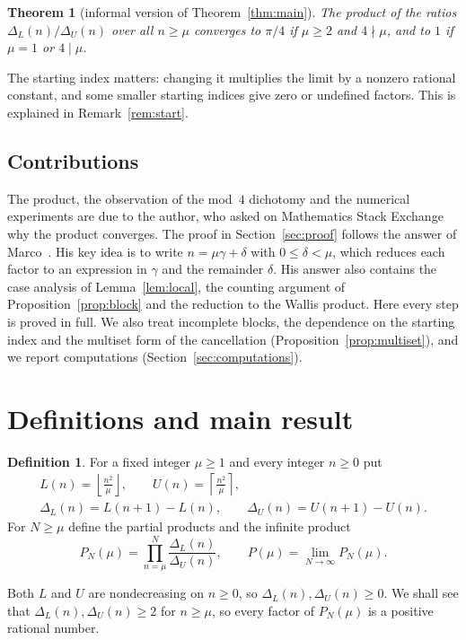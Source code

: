 \documentclass{amsart}
\newtheorem*{theorem*}{Theorem}
\theoremstyle{definition}
\newtheorem{definition}{Definition}
\theoremstyle{remark}
\newcommand{\DL}{\Delta_L}
\newcommand{\DU}{\Delta_U}
\newcommand{\floor}[1]{\left\lfloor #1\right\rfloor}
\newcommand{\ceil}[1]{\left\lceil #1\right\rceil}
\begin{document}
\begin{theorem*}[informal version of Theorem~\ref{thm:main}]
The product of the ratios $\DL(n)/\DU(n)$ over all $n\ge\mu$ converges to $\pi/4$ if $\mu\ge2$ and $4\nmid\mu$, and to $1$ if $\mu=1$ or $4\mid\mu$.
\end{theorem*}

The starting index matters: changing it multiplies the limit by a nonzero rational constant, and some smaller starting indices give zero or undefined factors. This is explained in Remark~\ref{rem:start}.

\subsection*{Contributions}
The product, the observation of the mod~$4$ dichotomy and the numerical experiments are due to the author, who asked on Mathematics Stack Exchange why the product converges. The proof in Section~\ref{sec:proof} follows the answer of Marco~\cite{marco2025}. His key idea is to write $n=\mu\gamma+\delta$ with $0\le\delta<\mu$, which reduces each factor to an expression in $\gamma$ and the remainder $\delta$. His answer also contains the case analysis of Lemma~\ref{lem:local}, the counting argument of Proposition~\ref{prop:block} and the reduction to the Wallis product. Here every step is proved in full. We also treat incomplete blocks, the dependence on the starting index and the multiset form of the cancellation (Proposition~\ref{prop:multiset}), and we report computations (Section~\ref{sec:computations}).

\section{Definitions and main result}

\begin{definition}\label{def:basic}
For a fixed integer $\mu\ge1$ and every integer $n\ge0$ put
\begin{gather*}
L(n)=\floor{\frac{n^2}{\mu}},\qquad U(n)=\ceil{\frac{n^2}{\mu}},\\
\DL(n)=L(n+1)-L(n),\qquad \DU(n)=U(n+1)-U(n).
\end{gather*}
For $N\ge\mu$ define the partial products and the infinite product
\[
P_N(\mu)=\prod_{n=\mu}^{N}\frac{\DL(n)}{\DU(n)},\qquad P(\mu)=\lim_{N\to\infty}P_N(\mu).
\]
\end{definition}

Both $L$ and $U$ are nondecreasing on $n\ge0$, so $\DL(n),\DU(n)\ge0$. We shall see that $\DL(n),\DU(n)\ge2$ for $n\ge\mu$, so every factor of $P_N(\mu)$ is a positive rational number.
\end{document}
